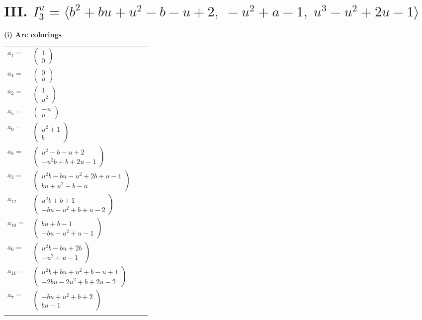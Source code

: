 \documentclass[1p]{elsarticle_modified}
\theoremstyle{definition}
\begin{document}
\centering \section*{III. $I^u_{3}= \langle b^2+b u+u^2- b- u+2,\;- u^2+a-1,\;u^3- u^2+2 u-1 \rangle$}
\flushleft \textbf{(i) Arc colorings}\\
\begin{tabular}{m{7pt} m{180pt} m{7pt} m{180pt} }
\flushright $a_{1}=$&$\begin{pmatrix}1\\0\end{pmatrix}$ \\
\flushright $a_{4}=$&$\begin{pmatrix}0\\u\end{pmatrix}$ \\
\flushright $a_{2}=$&$\begin{pmatrix}1\\u^2\end{pmatrix}$ \\
\flushright $a_{5}=$&$\begin{pmatrix}- u\\u\end{pmatrix}$ \\
\flushright $a_{9}=$&$\begin{pmatrix}u^2+1\\b\end{pmatrix}$ \\
\flushright $a_{8}=$&$\begin{pmatrix}u^2- b- u+2\\- u^2 b+b+2 u-1\end{pmatrix}$ \\
\flushright $a_{3}=$&$\begin{pmatrix}u^2 b- b u- u^2+2 b+u-1\\b u+u^2- b- u\end{pmatrix}$ \\
\flushright $a_{12}=$&$\begin{pmatrix}u^2 b+b+1\\- b u- u^2+b+u-2\end{pmatrix}$ \\
\flushright $a_{10}=$&$\begin{pmatrix}b u+b-1\\- b u- u^2+u-1\end{pmatrix}$ \\
\flushright $a_{6}=$&$\begin{pmatrix}u^2 b- b u+2 b\\- u^2+u-1\end{pmatrix}$ \\
\flushright $a_{11}=$&$\begin{pmatrix}u^2 b+b u+u^2+b- u+1\\-2 b u-2 u^2+b+2 u-2\end{pmatrix}$ \\
\flushright $a_{7}=$&$\begin{pmatrix}- b u+u^2+b+2\\b u-1\end{pmatrix}$\\&\end{tabular}
\end{document}
